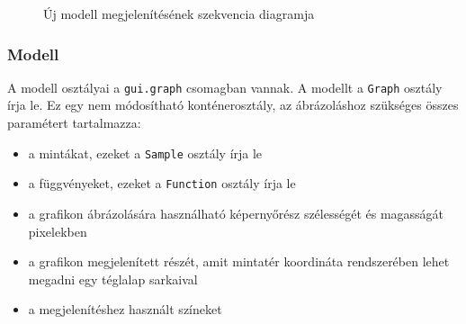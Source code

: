 \begin{figure}[H]
\centering
\caption{Új modell megjelenítésének szekvencia diagramja}
\end{figure}

\subsubsection{Modell}

A modell osztályai a \texttt{gui.graph} csomagban vannak.
A modellt a \texttt{Graph} osztály írja le.
Ez egy nem módosítható konténerosztály, az ábrázoláshoz szükséges összes paramétert tartalmazza:
\begin{itemize}
\item a mintákat, ezeket a \texttt{Sample} osztály írja le
\item a függvényeket, ezeket a \texttt{Function} osztály írja le
\item a grafikon ábrázolására használható képernyőrész szélességét és magasságát pixelekben
\item a grafikon megjelenített részét, amit mintatér koordináta rendszerében lehet megadni egy téglalap sarkaival
\item a megjelenítéshez használt színeket
\end{itemize}

